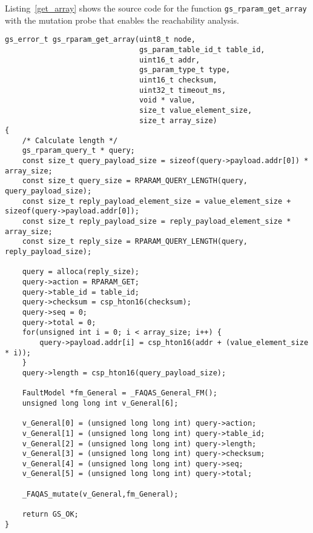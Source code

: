 Listing~\ref{get_array} shows the source code for the function \texttt{gs\_rparam\_get\_array} with the mutation probe that enables the reachability analysis. 

\begin{lstlisting}[style=CStyle,float=t, caption=Instrumented code for function gs\_rparam\_get\_array., label=get_array]
gs_error_t gs_rparam_get_array(uint8_t node,
                               gs_param_table_id_t table_id,
                               uint16_t addr,
                               gs_param_type_t type,
                               uint16_t checksum,
                               uint32_t timeout_ms,
                               void * value,
                               size_t value_element_size,
                               size_t array_size)
{
    /* Calculate length */
    gs_rparam_query_t * query;
    const size_t query_payload_size = sizeof(query->payload.addr[0]) * array_size;
    const size_t query_size = RPARAM_QUERY_LENGTH(query, query_payload_size);
    const size_t reply_payload_element_size = value_element_size + sizeof(query->payload.addr[0]);
    const size_t reply_payload_size = reply_payload_element_size * array_size;
    const size_t reply_size = RPARAM_QUERY_LENGTH(query, reply_payload_size);

    query = alloca(reply_size);
    query->action = RPARAM_GET;
    query->table_id = table_id;
    query->checksum = csp_hton16(checksum);
    query->seq = 0;
    query->total = 0;
    for(unsigned int i = 0; i < array_size; i++) {
        query->payload.addr[i] = csp_hton16(addr + (value_element_size * i));
    }
    query->length = csp_hton16(query_payload_size);

    FaultModel *fm_General = _FAQAS_General_FM();
    unsigned long long int v_General[6];

    v_General[0] = (unsigned long long int) query->action;
    v_General[1] = (unsigned long long int) query->table_id;
    v_General[2] = (unsigned long long int) query->length;
    v_General[3] = (unsigned long long int) query->checksum;
    v_General[4] = (unsigned long long int) query->seq;
    v_General[5] = (unsigned long long int) query->total;

    _FAQAS_mutate(v_General,fm_General);

    return GS_OK;
}
\end{lstlisting}



